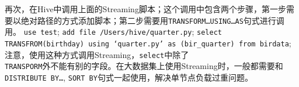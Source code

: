 再次，在Hive中调用上面的Streaming脚本；这个调用中包含两个步骤，第一步需要以绝对路径的方式添加脚本；第二步需要用\texttt{TRANSFORM\ldots{}USING\ldots{}AS}句式进行调用。
\texttt{use test}; \texttt{add file /Users/hive/quarter.py}; \texttt{select TRANSFROM(birthday)
using `quarter.py' as (bir\_quarter) from birdata};
注意，使用这种方式调用Streaming，\texttt{select}中除了\\\texttt{TRANSPORM}外不能有别的字段。在大数据集上使用Streaming时，一般都需要和\texttt{DISTRIBUTE
BY\ldots{}}, \texttt{SORT BY}句式一起使用，解决单节点负载过重问题。
